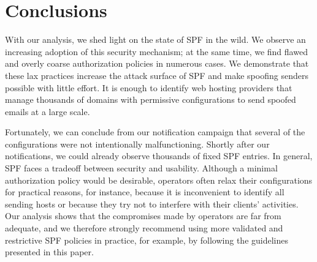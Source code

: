 \section{Conclusions}
\label{sec:conclusions}

With our analysis, we shed light on the state of SPF in the wild.
We observe an increasing adoption of this security mechanism; at the same time, we find flawed and overly coarse authorization policies in numerous cases.
We demonstrate that these lax practices increase the attack surface of SPF and make spoofing senders possible with little effort.
It is enough to identify web hosting providers that manage thousands of domains with permissive configurations to send spoofed emails at a large scale.

Fortunately, we can conclude from our notification campaign that several of the configurations were not intentionally malfunctioning.
Shortly after our notifications, we could already observe thousands of fixed SPF entries. In general, SPF faces a tradeoff between security and usability.
Although a minimal authorization policy would be desirable, operators often relax their configurations for practical reasons, for instance, because it is inconvenient to identify all sending hosts or because they try not to interfere with their clients' activities.
Our analysis shows that the compromises made by operators are far from adequate, and we therefore strongly recommend using more validated and restrictive SPF policies in practice, for example, by following the guidelines presented in this paper.
